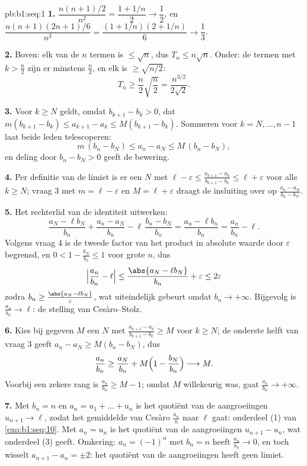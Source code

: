 \begin{solution}{pb:b1:seq:1}
\textbf{1.} $\dfrac{n(n+1)/2}{n^2} = \dfrac{1 + 1/n}{2} \to \dfrac12$, en
$\dfrac{n(n+1)(2n+1)/6}{n^3} = \dfrac{(1 + 1/n)(2 + 1/n)}{6} \to
\dfrac13$.

\textbf{2.} Boven: elk van de $n$ termen is $\leq \sqrt n$, dus $T_n \leq
n\sqrt n$. Onder: de termen met $k > \frac n2$ zijn er minstens $\frac
n2$, en elk is $\geq \sqrt{n/2}$:
\[
T_n \geq \frac n2 \sqrt{\frac n2} = \frac{n^{3/2}}{2\sqrt 2} .
\]

\textbf{3.} Voor $k \geq N$ geldt, omdat $b_{k+1} - b_k > 0$, dat
$m(b_{k+1} - b_k) \leq a_{k+1} - a_k \leq M(b_{k+1} - b_k)$. Sommeren
voor $k = N, \dots, n - 1$ laat beide leden telescoperen:
\[
m\,(b_n - b_N) \leq a_n - a_N \leq M\,(b_n - b_N),
\]
en deling door $b_n - b_N > 0$ geeft de bewering.

\textbf{4.} Per definitie van de limiet is er een $N$ met $\ell -
\varepsilon \leq \frac{a_{k+1} - a_k}{b_{k+1} - b_k} \leq \ell +
\varepsilon$ voor alle $k \geq N$; vraag 3 met $m = \ell - \varepsilon$
en $M = \ell + \varepsilon$ draagt de insluiting over op $\frac{a_n -
a_N}{b_n - b_N}$.

\textbf{5.} Het rechterlid van de identiteit uitwerken:
\[
\frac{a_N - \ell b_N}{b_n} + \frac{a_n - a_N}{b_n} -
\ell\,\frac{b_n - b_N}{b_n}
= \frac{a_n - \ell b_n}{b_n} = \frac{a_n}{b_n} - \ell .
\]
Volgens vraag 4 is de tweede factor van het product in absolute waarde
door $\varepsilon$ begrensd, en $0 < 1 - \frac{b_N}{b_n} \leq 1$ voor
grote $n$, dus
\[
\Bigl|\frac{a_n}{b_n} - \ell\Bigr|
\leq \frac{\abs{a_N - \ell b_N}}{b_n} + \varepsilon
\leq 2\varepsilon
\]
zodra $b_n \geq \frac{\abs{a_N - \ell b_N}}{\varepsilon}$, wat
uiteindelijk gebeurt omdat $b_n \to +\infty$. Bijgevolg is
$\frac{a_n}{b_n} \to \ell$: de stelling van Cesàro--Stolz.

\textbf{6.} Kies bij gegeven $M$ een $N$ met $\frac{a_{k+1} -
a_k}{b_{k+1} - b_k} \geq M$ voor $k \geq N$; de onderste helft van vraag
3 geeft $a_n - a_N \geq M(b_n - b_N)$, dus
\[
\frac{a_n}{b_n} \geq \frac{a_N}{b_n} +
M\Bigl(1 - \frac{b_N}{b_n}\Bigr) \longrightarrow M .
\]
Voorbij een zekere rang is $\frac{a_n}{b_n} \geq M - 1$; omdat $M$
willekeurig was, gaat $\frac{a_n}{b_n} \to +\infty$.

\textbf{7.} Met $b_n = n$ en $a_n = u_1 + \dots + u_n$ is het quotiënt
van de aangroeiingen $u_{n+1} \to \ell$, zodat het gemiddelde van Cesàro
$\frac{a_n}{n}$ naar $\ell$ gaat: onderdeel (1) van
\cref{exo:b1:seq:10}. Met $a_n = u_n$ is het quotiënt van de
aangroeiingen $u_{n+1} - u_n$, wat onderdeel (3) geeft. Omkering: $a_n =
(-1)^n$ met $b_n = n$ heeft $\frac{a_n}{b_n} \to 0$, en toch wisselt
$a_{n+1} - a_n = \pm 2$: het quotiënt van de aangroeiingen heeft geen
limiet.


\end{solution}
